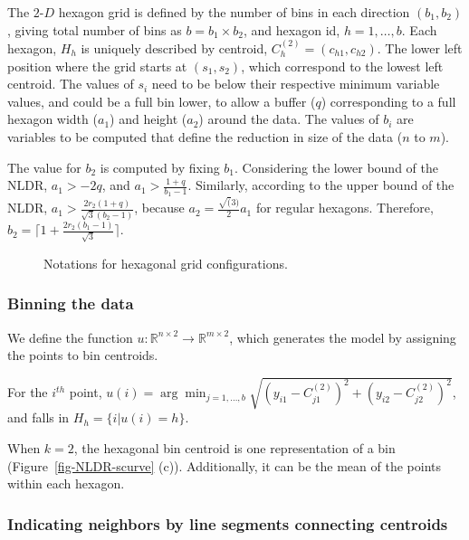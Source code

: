 \documentclass[
  12pt]{article}
\newcommand\gD{$2\text{-}D$}
\begin{document}
The \gD{} hexagon grid is defined by the number of bins in each
direction \((b_1, b_2)\), giving total number of bins as
\(b = b_1 \times b_2\), and hexagon id, \(h = 1, \dots, b\). Each
hexagon, \(H_h\) is uniquely described by centroid,
\(C_{h}^{(2)} = (c_{h1}, c_{h2})\). The lower left position where the
grid starts at \((s_1, s_2)\), which correspond to the lowest left
centroid. The values of \(s_i\) need to be below their respective
minimum variable values, and could be a full bin lower, to allow a
buffer (\(q\)) corresponding to a full hexagon width (\(a_1\)) and
height (\(a_2\)) around the data. The values of \(b_i\) are variables to
be computed that define the reduction in size of the data (\(n\) to
\(m\)).

The value for \(b_2\) is computed by fixing \(b_1\). Considering the
lower bound of the NLDR, \(a_1 > -2q\), and
\(a_1 > \frac{1+q}{b_1 -1}\). Similarly, according to the upper bound of
the NLDR, \(a_1 > \frac{2r_2(1 + q)}{\sqrt{3}(b_2 - 1)}\), because
\(a_2 = \frac{\sqrt(3)}{2}a_1\) for regular hexagons. Therefore,
\(b_2 = \Big\lceil1 +\frac{2r_2(b_1 - 1)}{\sqrt{3}}\Big\rceil\).

\begin{figure}[H]


\caption{\label{fig-hex-param}Notations for hexagonal grid
configurations.}

\end{figure}%

\subsubsection{Binning the data}\label{binning-the-data}

We define the function
\(u: \mathbb{R}^{n\times 2} \rightarrow \mathbb{R}^{m\times 2}\), which
generates the model by assigning the points to bin centroids.

For the \(i^{th}\) point,
\(u(i) = \arg\min_{j = 1, \dots, b} \sqrt{(y_{i1} - C^{(2)}_{j1})^2 + (y_{i2} - C^{(2)}_{j2})^2}\),
and falls in \(H_h = \{i| u(i) = h\}\).

When \(k = 2\), the hexagonal bin centroid is one representation of a
bin (Figure~\ref{fig-NLDR-scurve} (c)). Additionally, it can be the mean
of the points within each hexagon.

\subsubsection{Indicating neighbors by line segments connecting
centroids}\label{indicating-neighbors-by-line-segments-connecting-centroids}
\end{document}
